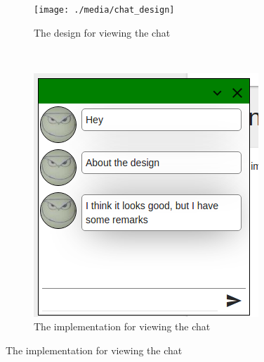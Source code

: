 \begin{figure}[ht!]
    \centering
    \begin{subfigure}[b]{0.45\textwidth}
        \centering
        \texttt{[image: ./media/chat\_design]}
        \caption{The design for viewing the chat}
        \label{fig:chat-design}
    \end{subfigure}
    ~
    \begin{subfigure}[b]{0.45\textwidth}
        \includegraphics[width=\textwidth]{./media/chat_implementation}
        \caption{The implementation for viewing the chat}
        \label{fig:chat-implementation}
    \end{subfigure}
\end{figure}
